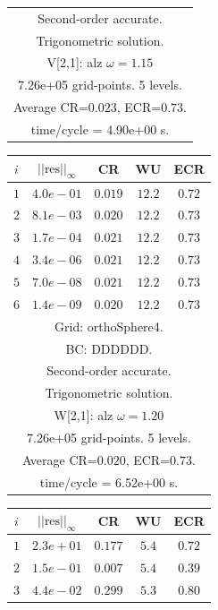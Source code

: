 \begin{table}[hbt]
\begin{center}
{\begin{tabular}{|c|c|c|c|c|}
\multicolumn{5}{|c|}{Second-order accurate.}  \\
\multicolumn{5}{|c|}{Trigonometric solution.}  \\
\multicolumn{5}{|c|}{V[2,1]: alz $\omega=1.15$}  \\
\multicolumn{5}{|c|}{7.26e+05 grid-points. 5 levels.}  \\
\multicolumn{5}{|c|}{Average CR=$0.023$, ECR=$0.73$.}  \\
\multicolumn{5}{|c|}{time/cycle = 4.90e+00 s.}  \\
\hline 
\end{tabular}
\begin{tabular}{|c|c|c|c|c|} \hline 
 $i$   & $\vert\vert\mbox{res}\vert\vert_\infty$  &  CR     &  WU    & ECR  \\   \hline 
 $ 1$  & $ 4.0e-01$ & $0.019$ & $12.2$ & $0.72$ \\ 
 $ 2$  & $ 8.1e-03$ & $0.020$ & $12.2$ & $0.73$ \\ 
 $ 3$  & $ 1.7e-04$ & $0.021$ & $12.2$ & $0.73$ \\ 
 $ 4$  & $ 3.4e-06$ & $0.021$ & $12.2$ & $0.73$ \\ 
 $ 5$  & $ 7.0e-08$ & $0.021$ & $12.2$ & $0.73$ \\ 
 $ 6$  & $ 1.4e-09$ & $0.020$ & $12.2$ & $0.73$ \\ 
\hline 
\multicolumn{5}{|c|}{Grid: orthoSphere4.}  \\
\multicolumn{5}{|c|}{BC: DDDDDD.}  \\
\multicolumn{5}{|c|}{Second-order accurate.}  \\
\multicolumn{5}{|c|}{Trigonometric solution.}  \\
\multicolumn{5}{|c|}{W[2,1]: alz $\omega=1.20$}  \\
\multicolumn{5}{|c|}{7.26e+05 grid-points. 5 levels.}  \\
\multicolumn{5}{|c|}{Average CR=$0.020$, ECR=$0.73$.}  \\
\multicolumn{5}{|c|}{time/cycle = 6.52e+00 s.}  \\
\hline 
\end{tabular}
\begin{tabular}{|c|c|c|c|c|} \hline 
 $i$   & $\vert\vert\mbox{res}\vert\vert_\infty$  &  CR     &  WU    & ECR  \\   \hline 
 $ 1$  & $ 2.3e+01$ & $0.177$ & $ 5.4$ & $0.72$ \\ 
 $ 2$  & $ 1.5e-01$ & $0.007$ & $ 5.4$ & $0.39$ \\ 
 $ 3$  & $ 4.4e-02$ & $0.299$ & $ 5.3$ & $0.80$ \\ 

\end{tabular}}
\end{center}
\end{table}
